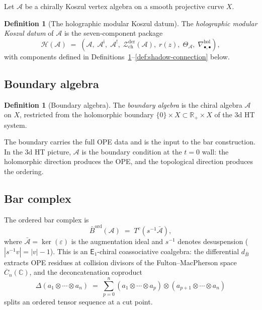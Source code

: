\documentclass[11pt,reqno]{amsart}
\theoremstyle{definition}
\newtheorem{definition}[theorem]{Definition}
\theoremstyle{remark}
\newcommand{\cA}{\mathcal{A}}
\newcommand{\cH}{\mathcal{H}}
\newcommand{\cZ}{\mathcal{Z}}
\newcommand{\Eone}{\mathsf{E}_{1}}
\newcommand{\barB}{\bar{B}}
\newcommand{\FM}{\overline{C}}
\newcommand{\hol}{\mathrm{hol}}
\newcommand{\bC}{\mathbb{C}}
\newcommand{\bR}{\mathbb{R}}
\numberwithin{equation}{section}
\begin{document}
Let $\cA$ be a chirally Koszul vertex algebra on a smooth projective
curve $X$.

\begin{definition}[The holographic modular Koszul datum]
\label{def:holographic-datum}
The \emph{holographic modular Koszul datum} of $\cA$ is the
seven-component package
\begin{equation}\label{eq:datum}
\cH(\cA) \;=\;
(\cA,\; \cA^{\mathrm{i}},\; \cA^!,\;
\cZ^{\mathrm{der}}_{\mathrm{ch}}(\cA),\; r(z),\;
\Theta_{\cA},\; \nabla^{\hol}_{\bullet,\bullet}),
\end{equation}
with components defined in
Definitions~\ref{def:boundary}--\ref{def:shadow-connection}
below.
\end{definition}


\subsection{Boundary algebra}\label{subsec:boundary}

\begin{definition}[Boundary algebra]\label{def:boundary}
The \emph{boundary algebra} is the chiral algebra $\cA$ on $X$,
restricted from the holomorphic boundary
$\{0\} \times X \subset \bR_+ \times X$ of the 3d HT system.
\end{definition}

The boundary carries the full OPE data and is the input to the bar
construction. In the 3d HT picture, $\cA$ is the boundary condition
at the $t = 0$ wall: the holomorphic direction produces the OPE, and
the topological direction produces the ordering.


\subsection{Bar complex}\label{subsec:bar}

The ordered bar complex is
\begin{equation}\label{eq:bar}
\barB^{\mathrm{ord}}(\cA) \;=\; T^c(s^{-1}\bar{\cA}),
\end{equation}
where $\bar{\cA} = \ker(\varepsilon)$ is the augmentation ideal and
$s^{-1}$ denotes desuspension ($|s^{-1}v| = |v| - 1$). This is an
$\Eone$-chiral coassociative coalgebra: the differential $d_{\barB}$
extracts OPE residues at collision divisors of the
Fulton--MacPherson space $\FM_n(\bC)$, and the deconcatenation
coproduct
\begin{equation}\label{eq:deconc}
\Delta(a_1 \otimes \cdots \otimes a_n) \;=\;
\sum_{p=0}^{n}
(a_1 \otimes \cdots \otimes a_p) \otimes
(a_{p+1} \otimes \cdots \otimes a_n)
\end{equation}
splits an ordered tensor sequence at a cut point.
\end{document}

